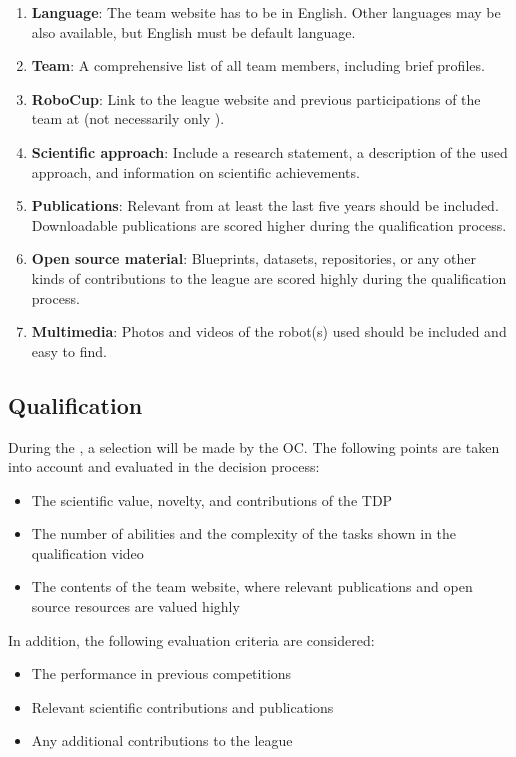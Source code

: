 \begin{enumerate}
	\item \textbf{Language}: The team website has to be in English. Other languages may be also available, but English must be default language.
	\item \textbf{Team}: A comprehensive list of all team members, including brief profiles.
	\item \textbf{RoboCup}: Link to the league website and previous participations of the team at \RoboCup{} (not necessarily only \AtHome).
	\item \textbf{Scientific approach}: Include a research statement, a description of the used approach, and information on scientific achievements.
	\item \textbf{Publications}: Relevant  from at least the last five years should be included. Downloadable publications are scored higher during the qualification process.
	\item \textbf{Open source material}: Blueprints, datasets, repositories, or any other kinds of contributions to the league are scored highly during the qualification process.
	\item \textbf{Multimedia}: Photos and videos of the robot(s) used should be included and easy to find.
\end{enumerate}

\subsection{Qualification}
\label{rule:qualification}

During the , a selection will be made by the OC.
The following points are taken into account and evaluated in the decision process:
\begin{itemize}
	\item The scientific value, novelty, and contributions of the TDP
	\item The number of abilities and the complexity of the tasks shown in the qualification video
	\item The contents of the team website, where relevant publications and open source resources are valued highly
\end{itemize}
In addition, the following evaluation criteria are considered:
\begin{itemize}
	\item The performance in previous competitions
	\item Relevant scientific contributions and publications
	\item Any additional contributions to the \AtHome{} league
\end{itemize}

